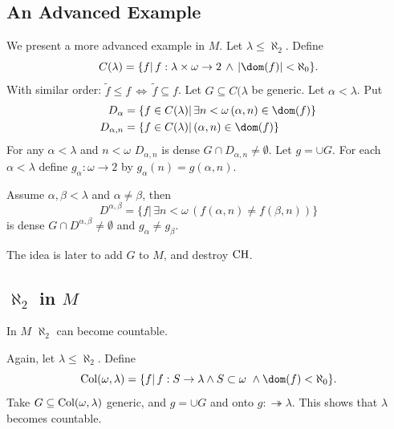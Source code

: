 \documentclass[11pt,pdftex,twoside,a4paper]{article}
\newcommand{\CH}{\ensuremath{\mathop{\rm CH}\nolimits}}
\theoremstyle{definition}
\begin{document}
\subsection{An Advanced Example}

We present a more advanced example in $M$.
Let \(\lambda \leq \aleph_2\). Define
\begin{equation*}
C(\lambda) = \{f|\, f:\lambda\times\omega\to 2 \,\wedge\, |\dom(f)|<\aleph_0\}.
\end{equation*}
With similar order:
\(\tilde{f}\leq f \,\Leftrightarrow\, \tilde{f} \subseteq f\).
Let \(G \subseteq C(\lambda\) be generic.
Let \(\alpha < \lambda\). Put
\begin{align*}
D_\alpha &= \{f\in C(\lambda)|\, \exists n<\omega\, (\alpha,n)\in \dom(f)\} \\
D_{\alpha,n} &= \{f\in C(\lambda)|\, (\alpha,n)\in \dom(f)\}
\end{align*}
For any \(\alpha<\lambda\) and \(n<\omega\) \(D_{\alpha,n}\) is dense
\(G\cap D_{\alpha,n} \neq \emptyset\).
Let \(g = \cup G\). For each \(\alpha<\lambda\)
define \(g_\alpha:\omega\to 2\) by \(g_\alpha(n) = g(\alpha,n)\).

Assume \(\alpha,\beta<\lambda\) and \(\alpha\neq\beta\), then
\begin{equation*}
D^{\alpha,\beta} = \{f |\,\exists n<\omega\,(f(\alpha,n)\neq f(\beta,n))\}
\end{equation*}
is dense \(G\cap D^{\alpha,\beta} \neq \emptyset\)
and \(g_\alpha \neq g_\beta\).

The idea is later to add $G$ to $M$, and destroy \CH.

\subsection{\(\aleph_2\) in $M$}

In $M$ \(\aleph_2\) can become countable.

Again, let \(\lambda \leq \aleph_2\). Define
\begin{equation*}
\textnormal{Col}(\omega,\lambda)
  = \{f|\, f: S\to\lambda \wedge S\subset\omega\ \wedge \dom(f)<\aleph_0\}.
\end{equation*}
Take \(G\subseteq \textnormal{Col}(\omega,\lambda)\) generic,
and \(g = \cup G\) and onto \(g:\twoheadrightarrow \lambda\).
This shows that \(\lambda\) becomes countable.
\end{document}
